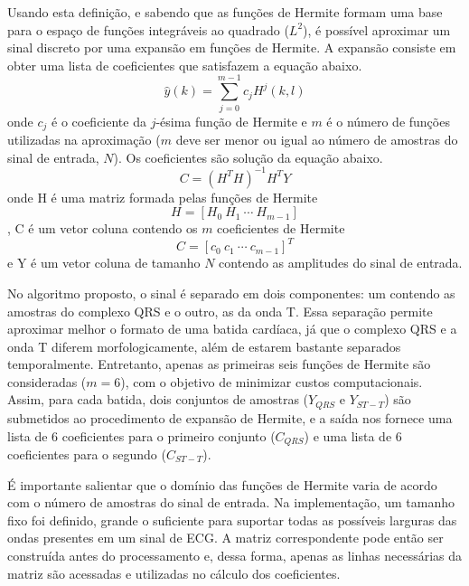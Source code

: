 Usando esta definição, e sabendo que as funções de Hermite formam uma base para o espaço de funções integráveis ao quadrado ($L^2$), é possível aproximar um sinal discreto por uma expansão em funções de Hermite. A expansão consiste em obter uma lista de coeficientes que satisfazem a equação abaixo.
\begin{equation} \label{equ:hermite_expansion}
   \hat{y}(k) = \sum_{j=0}^{m-1} c_jH^j(k,l)
\end{equation}
onde $c_j$ é o coeficiente da $j$-ésima função de Hermite e $m$ é o número de funções utilizadas na aproximação ($m$ deve ser menor ou igual ao número de amostras do sinal de entrada, $N$). Os coeficientes são solução da equação abaixo.
\begin{equation} \label{equ:solve}
    C = (H^TH)^{-1}H^TY
\end{equation}
onde H é uma matriz formada pelas funções de Hermite
\begin{equation}
    H = [H_0\ H_1\ \cdots\ H_{m-1}]
\end{equation},
C é um vetor coluna contendo os $m$ coeficientes de Hermite
\begin{equation}
    C = [c_0\ c_1\ \cdots\ c_{m-1}]^T
\end{equation}
e Y é um vetor coluna de tamanho $N$ contendo as amplitudes do sinal de entrada.

No algoritmo proposto, o sinal é separado em dois componentes: um contendo as amostras do complexo QRS e o outro, as da onda T. Essa separação permite aproximar melhor o formato de uma batida cardíaca, já que o complexo QRS e a onda T diferem morfologicamente, além de estarem bastante separados temporalmente. Entretanto, apenas as primeiras seis funções de Hermite são consideradas ($m = 6$), com o objetivo de minimizar custos computacionais. Assim, para cada batida, dois conjuntos de amostras ($Y_{QRS}$ e $Y_{ST-T}$) são submetidos ao procedimento de expansão de Hermite, e a saída nos fornece uma lista de 6 coeficientes para o primeiro conjunto ($C_{QRS}$) e uma lista de 6 coeficientes para o segundo ($C_{ST-T}$).

É importante salientar que o domínio das funções de Hermite varia de acordo com o número de amostras do sinal de entrada. Na implementação, um tamanho fixo foi definido, grande o suficiente para suportar todas as possíveis larguras das ondas presentes em um sinal de ECG. A matriz correspondente pode então ser construída antes do processamento e, dessa forma, apenas as linhas necessárias da matriz são acessadas e utilizadas no cálculo dos coeficientes.
